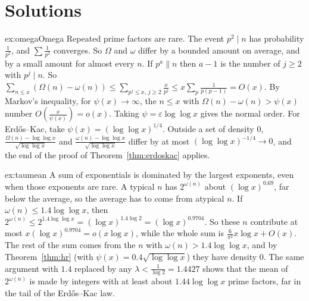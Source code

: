 \section{Solutions}

\begin{solution}{ex:omegaOmega}
\idea Repeated prime factors are rare. The event $p^2\mid n$ has probability $\frac1{p^2}$, and $\sum\frac1{p^2}$ converges. So $\Omega$ and $\omega$ differ by a bounded amount on average, and by a small amount for almost every $n$.
\writeup If $p^a\|n$ then $a-1$ is the number of $j\ge2$ with $p^j\mid n$. So $\sum_{n\le x}(\Omega(n)-\omega(n))\le\sum_{p^j\le x,\,j\ge2}\frac x{p^j}\le x\sum_p\frac1{p(p-1)}=O(x)$. By Markov's inequality, for $\psi(x)\to\infty$, the
$n\le x$ with $\Omega(n)-\omega(n)>\psi(x)$ number $O(\frac x{\psi(x)})=o(x)$. Taking $\psi=\varepsilon\log\log x$ gives the normal order. For Erd\H{o}s--Kac, take $\psi(x)=(\log\log x)^{1/4}$. Outside a set of density $0$,
$\frac{\Omega(n)-\log\log x}{\sqrt{\log\log x}}$ and $\frac{\omega(n)-\log\log x}{\sqrt{\log\log x}}$ differ by at most $(\log\log x)^{-1/4}\to0$, and the end of the proof of Theorem~\ref{thm:erdoskac} applies.
\end{solution}

\begin{solution}{ex:taumean}
\idea A sum of exponentials is dominated by the largest exponents, even when those exponents are rare. A typical $n$ has $2^{\omega(n)}$ about $(\log x)^{0.69}$, far below the average, so the average has to come from atypical $n$.
\writeup If $\omega(n)\le1.4\log\log x$, then $2^{\omega(n)}\le2^{1.4\log\log x}=(\log x)^{1.4\log2}=(\log x)^{0.9704}$. So these $n$ contribute at most $x(\log x)^{0.9704}=o(x\log x)$, while the whole sum is
$\frac6{\pi^2}x\log x+O(x)$. The rest of the sum comes from the $n$ with $\omega(n)>1.4\log\log x$, and by Theorem~\ref{thm:hr} (with $\psi(x)=0.4\sqrt{\log\log x}$) they have density $0$. The same argument with
$1.4$ replaced by any $\lambda<\frac1{\log2}=1.4427$ shows that the mean of $2^{\omega(n)}$ is made by integers with at least about $1.44\log\log x$ prime factors, far in the tail of the Erd\H{o}s--Kac law.
\end{solution}

